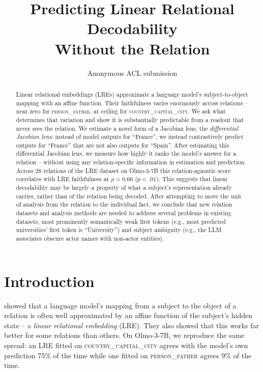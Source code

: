 \documentclass[11pt]{article}
\title{Predicting Linear Relational Decodability\\Without the Relation}
\author{Anonymous ACL submission}
\begin{document}
\maketitle


\begin{abstract}
Linear relational embeddings (LREs) approximate a language
model's subject-to-object mapping with an affine
function. Their faithfulness varies enormously across
relations -- near zero for \textsc{person\_father}, at
ceiling for \textsc{country\_capital\_city}. We ask what
determines that variation and show it is substantially
predictable from a readout that never sees the relation. We
estimate a
novel form of a
Jacobian lens, the \emph{differential Jacobian lens}:
instead of model outputs for
``France'', we instead
contrastively predict outputs for ``France''
that are not also outputs for ``Spain''.
After estimating
this differential Jacobian lens,
we measure how highly it ranks the model's answer
for a
relation 
-- without using any relation-specific
information in estimation and prediction.
Across
28 relations of the LRE dataset on Olmo-3-7B this
relation-agnostic score correlates with LRE faithfulness at
$\rho = 0.66$ ($p <.01$).  This suggests that linear
decodability may be largely a property of what a subject's
representation already carries, rather than of the relation
being decoded.
After attempting to 
move 
the unit of
analysis from the relation to the individual fact,
we conclude that new relation
datasets and analysis methods are needed to address several
problems in existing datasets, most prominently semantically
weak first tokens
(e.g., most predicted universities' first token
is ``University'') and subject ambiguity (e.g., the LLM
associates
obscure actor names with non-actor entities).
\end{abstract}


\section{Introduction}

\citet{hernandez2024linearity} showed that a language model's mapping from
a subject to the object of a relation is often well approximated by an
affine function of the subject's hidden state -- a \emph{linear relational
embedding} (LRE). They also showed that this works far better for some
relations than others. On Olmo-3-7B, we reproduce the same spread: an LRE
fitted on \textsc{country\_capital\_city} agrees with the model's own
prediction 75\% of the time while one fitted on \textsc{person\_father}
agrees 9\% of the time.
\end{document}
